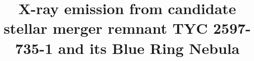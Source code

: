 \documentclass[linenumbers]{aastex631}
\begin{document}
\title{X-ray emission from candidate stellar merger remnant TYC 2597-735-1 and its Blue Ring Nebula}


\end{document}

